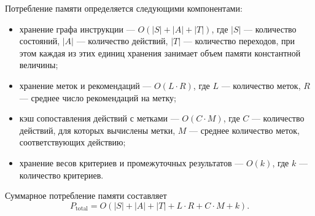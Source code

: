 Потребление памяти определяется следующими компонентами:
\begin{itemize}
    \item хранение графа инструкции --- \(O(|S| + |A| + |T|)\), где \(|S|\) --- количество состояний, \(|A|\) --- количество действий, \(|T|\) --- количество переходов, при этом каждая из этих единиц хранения занимает объем памяти константной величины;
    \item хранение меток и рекомендаций --- \(O(L \cdot R)\), где \(L\) --- количество меток, \(R\) --- среднее число рекомендаций на метку;
    \item кэш сопоставления действий с метками --- \(O(C \cdot M)\), где \(C\) --- количество действий, для которых вычислены метки, \(M\) --- среднее количество меток, соответствующих действию;
    \item хранение весов критериев и промежуточных результатов --- \(O(k)\), где \(k\) --- количество критериев.
\end{itemize}

Суммарное потребление памяти составляет
\begin{equation}
    P_{\text{total}} = O(|S| + |A| + |T| + L \cdot R + C \cdot M + k).
    \label{eq:summpotr}
\end{equation}

